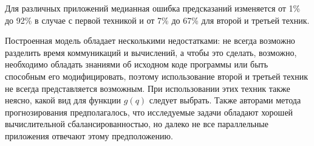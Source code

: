 
		Для различных приложений медианная ошибка предсказаний изменяется от 1\% до 92\% в случае с первой техникой и от 7\% до 67\% для второй и третьей техник.

		Построенная модель обладает несколькими недостатками: не всегда возможно разделить время коммуникаций и вычислений, а чтобы это сделать, возможно, необходимо обладать знаниями об исходном коде программы или быть способным его модифицировать, поэтому использование второй и третьей техник не всегда представляется возможным. При использовании этих техник также неясно, какой вид для функции \(g(q)\) следует выбрать. Также авторами метода прогнозирования предполагалось, что исследуемые задачи обладают хорошей вычислительной сбалансированностью, но далеко не все параллельные приложения отвечают этому предположению.

